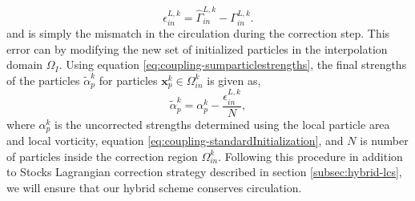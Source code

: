 		\begin{equation}
		\epsilon_{in}^{L,k} = \hat{\Gamma}_{in}^{L,k} - \Gamma_{in}^{L,k}.
		\label{eq:coupling-eq22}
		\end{equation}
	and is simply the mismatch in the circulation during the correction step. This error can by modifying the new set of initialized particles in the interpolation domain $\Omega_I$. Using equation \ref{eq:coupling-sumparticlestrengths}, the final strengths of the particles $\tilde{\alpha}_p^k$ for particles $\mathbf{x}_p^k \in \Omega_{in}^k$ is given as,
		\begin{equation}
		\tilde{\alpha}_p^k = \alpha_p^k - \frac{\epsilon_{in}^{L,k}}{N},
		\label{eq:coupling-particlestrengths}
		\end{equation}
	where $\alpha_p^k$ is the uncorrected strengths determined using the local particle area and local vorticity, equation \ref{eq:coupling-standardInitialization}, and $N$ is number of particles inside the correction region $\Omega_{in}^k$. Following this procedure in addition to Stocks Lagrangian correction strategy described in section \ref{subsec:hybrid-lcs}, we will ensure that our hybrid scheme conserves circulation.
	

